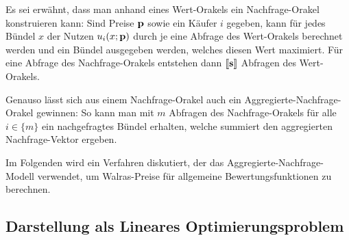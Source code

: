 Es sei erwähnt, dass man anhand eines Wert-Orakels ein Nachfrage-Orakel konstruieren kann:
Sind Preise $\mathbf{p}$ sowie ein Käufer $i$ gegeben, kann für jedes Bündel $x$ der Nutzen $u_i(x; \mathbf{p})$ durch je eine Abfrage des Wert-Orakels berechnet werden und ein Bündel ausgegeben werden, welches diesen Wert maximiert.
Für eine Abfrage des Nachfrage-Orakels entstehen dann $\left\llbracket \mathbf{s} \right\rrbracket$ Abfragen des Wert-Orakels.

Genauso lässt sich aus einem Nachfrage-Orakel auch ein Aggregierte-Nachfrage-Orakel gewinnen: So kann man mit $m$ Abfragen des Nachfrage-Orakels für alle $i\in\{m\}$ ein nachgefragtes Bündel erhalten, welche summiert den aggregierten Nachfrage-Vektor ergeben.

Im Folgenden wird ein Verfahren diskutiert, der das Aggregierte-Nachfrage-Modell verwendet, um Walras-Preise für allgemeine Bewertungsfunktionen zu berechnen.

\subsection{Darstellung als Lineares Optimierungsproblem}


